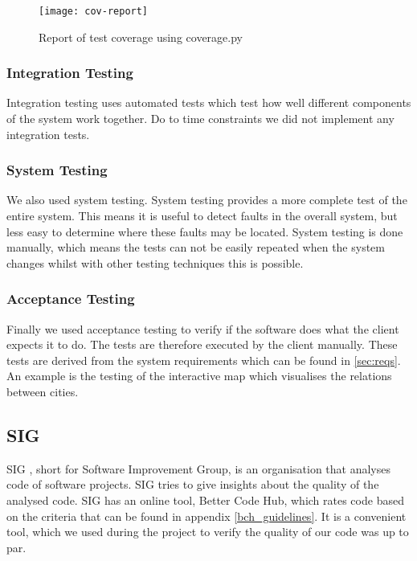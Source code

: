 \begin{figure}[ht]
\centering
\texttt{[image: cov-report]}
\caption{Report of test coverage using coverage.py}
\label{fig:cov-report}
\end{figure}

\subsubsection{Integration Testing}
Integration testing uses automated tests which test how well different components of the system work together. Do to time constraints we did not implement any integration tests. 

\subsubsection{System Testing}
We also used system testing. System testing provides a more complete test of the entire system. This means it is useful to detect faults in the overall system, but less easy to determine where these faults may be located. System testing is done manually, which means the tests can not be easily repeated when the system changes whilst with other testing techniques this is possible.

\subsubsection{Acceptance Testing}\label{sec:acceptance-testing}
Finally we used acceptance testing to verify if the software does what the client expects it to do. The tests are therefore executed by the client manually. These tests are derived from the system requirements which can be found in \ref{sec:reqs}.\\
An example is the testing of the interactive map which visualises the relations between cities.

\subsection{SIG}
SIG \cite{sig}, short for Software Improvement Group, is an organisation that analyses code of software projects. SIG tries to give insights about the quality of the analysed code. SIG has an online tool, Better Code Hub, which rates code based on the criteria that can be found in appendix \ref{bch_guidelines}. It is a convenient tool, which we used during the project to verify the quality of our code was up to par.

